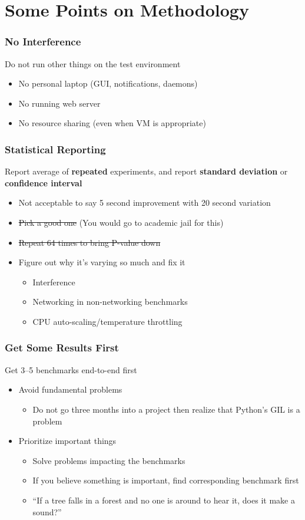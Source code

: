 \documentclass[xcolor={dvipsnames},aspectratio=149]{beamer}
\begin{document}
\section{Some Points on Methodology}
\begin{frame}
  \frametitle{No Interference}
  Do not run other things on the test environment
  \begin{itemize}
  \item No personal laptop (GUI, notifications, daemons)
  \item No running web server
  \item No resource sharing (even when VM is appropriate)
  \end{itemize}
\end{frame}

\begin{frame}
  \frametitle{Statistical Reporting}
  Report average of \textbf{repeated} experiments, and report \textbf{standard deviation} or
  \textbf{confidence interval}
  \begin{itemize}
  \item Not acceptable to say 5 second improvement with 20 second variation
  \item \sout{Pick a good one} (You would go to academic jail for this)
  \item \sout{Repeat 64 times to bring P-value down}
  \item Figure out why it's varying so much and fix it
    \begin{itemize}
    \item Interference
    \item Networking in non-networking benchmarks
    \item CPU auto-scaling/temperature throttling
    \end{itemize}
  \end{itemize}
\end{frame}

\begin{frame}
  \frametitle{Get Some Results First}
  Get 3--5 benchmarks end-to-end first
  \begin{itemize}
  \item Avoid fundamental problems
    \begin{itemize}
    \item Do not go three months into a project then realize that Python's GIL is a problem
    \end{itemize}
  \item Prioritize important things
    \begin{itemize}
    \item Solve problems impacting the benchmarks
    \item If you believe something is important, find corresponding benchmark first
    \item ``If a tree falls in a forest and no one is around to hear it, does it make a sound?''
    \end{itemize}
  \end{itemize}
\end{frame}
\end{document}
